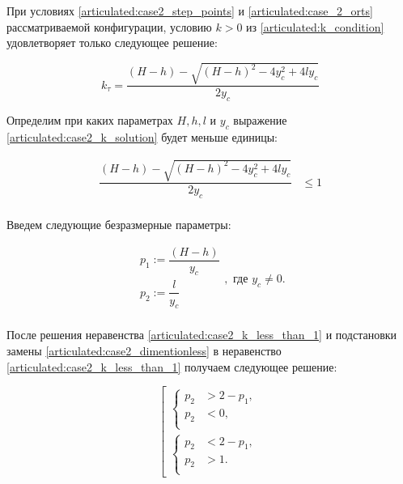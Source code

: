 При условиях \ref{articulated:case2_step_points} и \ref{articulated:case_2_orts} рассматриваемой конфигурации, условию $k>0$ из \ref{articulated:k_condition} удовлетворяет только следующее решение:

\begin{equation}
\label{articulated:case2_k_solution}
k_\tau = \dfrac{(H-h) - \sqrt{(H-h)^2 - 4y_c^2 + 4ly_c}}{2y_c}
\end{equation}

Определим при каких параметрах $H,h,l$ и $y_c$ выражение \ref{articulated:case2_k_solution} будет меньше единицы:

\begin{equation}
\label{articulated:case2_k_less_than_1}
\begin{alignedat}{3}
 \dfrac{(H - h) - \sqrt{(H-h)^2 - 4y_c^2+4ly_c}}{2y_c}  & \leq 1 \\
\end{alignedat}
\end{equation}

Введем следующие безразмерные параметры:

\begin{equation}
\label{articulated:case2_dimentionless}
\begin{alignedat}{1}
  p_1 := \dfrac{(H-h)}{y_c}\\
  p_2 := \dfrac{l}{y_c}\\
\end{alignedat}, \text{ где } y_c \ne 0.
\end{equation}

После решения неравенства \ref{articulated:case2_k_less_than_1} и подстановки замены \ref{articulated:case2_dimentionless} в неравенство \ref{articulated:case2_k_less_than_1} получаем следующее решение:


\begin{equation}
\label{articulated:case2_dimless_solution}
\left[
  \begin{alignedat}{1}
    \left\{
      \begin{alignedat}{2}
        p_2 &> 2-p_1,\\
        p_2 &< 0,\\
      \end{alignedat}
    \right.\\
    \left\{
      \begin{alignedat}{2}
        p_2 &< 2- p_1,\\
        p_2 &> 1.\\
      \end{alignedat}
    \right.
  \end{alignedat}
\right.
\end{equation}

